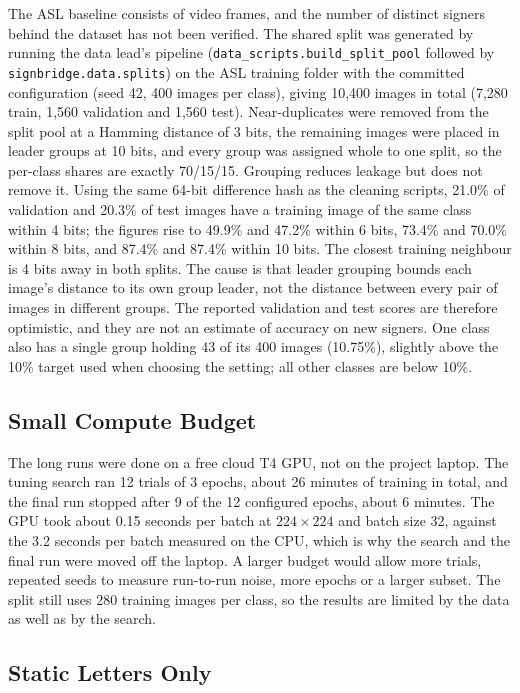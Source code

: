 The ASL baseline consists of video frames, and the number of distinct signers behind the dataset has not been verified. The shared split was generated by running the data lead's pipeline (\texttt{data\_scripts.build\_split\_pool} followed by \texttt{signbridge.data.splits}) on the ASL training folder with the committed configuration (seed 42, 400 images per class), giving 10{,}400 images in total (7{,}280 train, 1{,}560 validation and 1{,}560 test). Near-duplicates were removed from the split pool at a Hamming distance of 3 bits, the remaining images were placed in leader groups at 10 bits, and every group was assigned whole to one split, so the per-class shares are exactly 70/15/15. Grouping reduces leakage but does not remove it. Using the same 64-bit difference hash as the cleaning scripts, 21.0\% of validation and 20.3\% of test images have a training image of the same class within 4 bits; the figures rise to 49.9\% and 47.2\% within 6 bits, 73.4\% and 70.0\% within 8 bits, and 87.4\% and 87.4\% within 10 bits. The closest training neighbour is 4 bits away in both splits. The cause is that leader grouping bounds each image's distance to its own group leader, not the distance between every pair of images in different groups. The reported validation and test scores are therefore optimistic, and they are not an estimate of accuracy on new signers. One class also has a single group holding 43 of its 400 images (10.75\%), slightly above the 10\% target used when choosing the setting; all other classes are below 10\%.

\subsection{Small Compute Budget}

The long runs were done on a free cloud T4 GPU, not on the project laptop. The tuning search ran 12 trials of 3 epochs, about 26 minutes of training in total, and the final run stopped after 9 of the 12 configured epochs, about 6 minutes. The GPU took about 0.15 seconds per batch at $224\times224$ and batch size 32, against the 3.2 seconds per batch measured on the CPU, which is why the search and the final run were moved off the laptop. A larger budget would allow more trials, repeated seeds to measure run-to-run noise, more epochs or a larger subset. The split still uses 280 training images per class, so the results are limited by the data as well as by the search.

\subsection{Static Letters Only}

